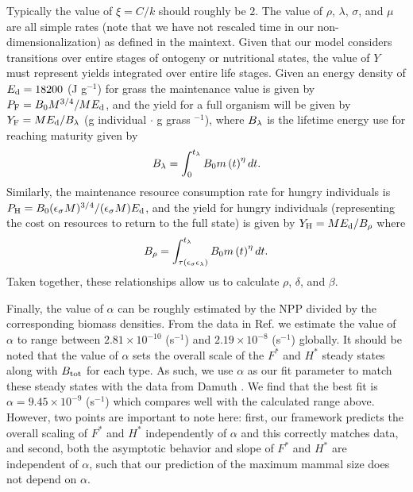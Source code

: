 \documentclass[twocolumn,preprintnumbers,amsmath,amssymb,superscriptaddress]{revtex4}
\begin{document}
{Typically the value of $\xi=C/k$ should roughly be $2$. The value of $\rho$, $\lambda$, $\sigma$, and $\mu$ are all simple rates (note that we have not rescaled time in our non-dimensionalization) as defined in the maintext. Given that our model considers transitions over entire stages of ontogeny or nutritional states, the value of $Y$ must represent yields integrated over entire life stages. Given an energy density of $E_{\rm d}=18200$ (J g$^{-1}$) for grass \citep{estermann} the maintenance value is given by $P_{\rm F}=B_{\rm 0}M^{3/4}/ME_{\rm d}$, and the yield for a full organism will be given by $Y_{\rm F}=ME_{\rm d}/B_{\rm \lambda}$ (g individual $\cdot$ g grass $^{-1}$), where $B_{\rm \lambda}$ is the lifetime energy use for reaching maturity given by
\begin{equation}
B_{\rm \lambda}=\int_{\rm 0}^{t_{\rm \lambda}}B_{\rm 0}m\left(t\right)^{\eta}dt.
\end{equation}
Similarly, the maintenance resource consumption rate for hungry individuals is $P_{\rm H}=B_{\rm 0}(\epsilon_{\rm \sigma}M)^{3/4}/(\epsilon_{\rm \sigma}M)E_{\rm d}$, and the yield for hungry individuals (representing the cost on resources to return to the full state) is given by $Y_{\rm H}=ME_{\rm d}/B_{\rm \rho}$ where
\begin{equation}
B_{\rm \rho}=\int_{\rm \tau\left(\epsilon_{\rm \sigma}\epsilon_{\rm \lambda}\right)}^{t_{\rm \lambda}}B_{\rm 0}m\left(t\right)^{\eta}dt.
\end{equation}
Taken together, these relationships allow us to calculate $\rho$, $\delta$, and $\beta$.

Finally, the value of $\alpha$ can be roughly estimated by the NPP divided by the corresponding biomass densities. From the data in Ref. \citep{michaletz2014convergence} we estimate the value of $\alpha$ to range between $2.81\times10^{-10}$ (s$^{-1}$) and $2.19\times10^{-8}$ (s$^{-1}$) globally. 
It should be noted that the value of $\alpha$ sets the overall scale of the $F^{*}$ and $H^{*}$ steady states along with $B_{\rm tot}$ for each type. As such, we use $\alpha$ as our fit parameter to match these steady states with the data from Damuth \citep{Damuth:1987kr}. We find that the best fit is $\alpha=9.45\times10^{-9}$ (s$^{-1}$) which compares well with the calculated range above. However, two points are important to note here: first, our framework predicts the overall scaling of $F^{*}$ and $H^{*}$ independently of $\alpha$ and this correctly matches data, and second, both the asymptotic behavior and slope of $F^{*}$ and $H^{*}$ are independent of $\alpha$, such that our prediction of the maximum mammal size does not depend on $\alpha$.\\



}
\end{document}
